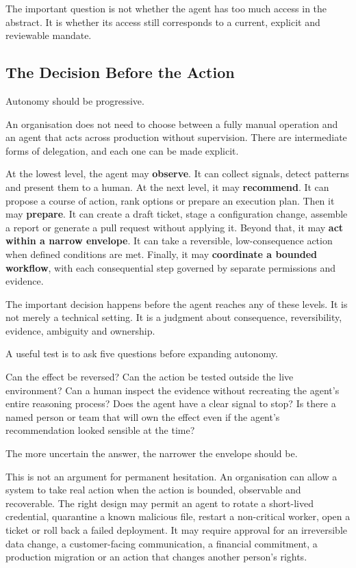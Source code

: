 The important question is not whether the agent has too much access in
the abstract. It is whether its access still corresponds to a current,
explicit and reviewable mandate.

\subsection{The Decision Before the
Action}\label{the-decision-before-the-action}

Autonomy should be progressive.

An organisation does not need to choose between a fully manual operation
and an agent that acts across production without supervision. There are
intermediate forms of delegation, and each one can be made explicit.

At the lowest level, the agent may \textbf{observe}. It can collect
signals, detect patterns and present them to a human. At the next level,
it may \textbf{recommend}. It can propose a course of action, rank
options or prepare an execution plan. Then it may \textbf{prepare}. It
can create a draft ticket, stage a configuration change, assemble a
report or generate a pull request without applying it. Beyond that, it
may \textbf{act within a narrow envelope}. It can take a reversible,
low-consequence action when defined conditions are met. Finally, it may
\textbf{coordinate a bounded workflow}, with each consequential step
governed by separate permissions and evidence.

The important decision happens before the agent reaches any of these
levels. It is not merely a technical setting. It is a judgment about
consequence, reversibility, evidence, ambiguity and ownership.

A useful test is to ask five questions before expanding autonomy.

Can the effect be reversed? Can the action be tested outside the live
environment? Can a human inspect the evidence without recreating the
agent's entire reasoning process? Does the agent have a clear signal to
stop? Is there a named person or team that will own the effect even if
the agent's recommendation looked sensible at the time?

The more uncertain the answer, the narrower the envelope should be.

This is not an argument for permanent hesitation. An organisation can
allow a system to take real action when the action is bounded,
observable and recoverable. The right design may permit an agent to
rotate a short-lived credential, quarantine a known malicious file,
restart a non-critical worker, open a ticket or roll back a failed
deployment. It may require approval for an irreversible data change, a
customer-facing communication, a financial commitment, a production
migration or an action that changes another person's rights.


